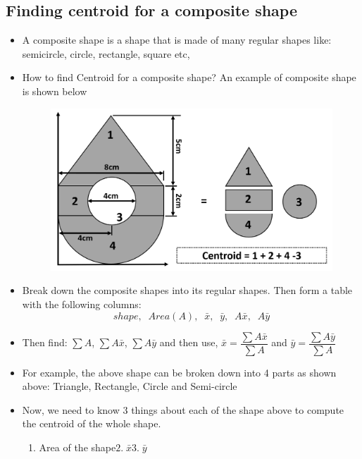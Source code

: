 \documentclass[8pt]{report}
\begin{document}
	\subsection{Finding centroid for a composite shape}
		\begin{itemize}
			\item A composite shape is a shape that is made of many regular shapes like: semicircle, circle, rectangle, square etc,
			\item How to find Centroid for a composite shape? An example of composite shape is shown below
			\begin{figure}[H]
				\centering
				\includegraphics[scale=0.4]{breakingcomposite.png}\\
			\end{figure}
			\item Break down the composite shapes into its regular shapes. Then form a table with the following columns: $$shape,\;\;Area(A),\;\;\bar{x},\;\;\bar{y},\;\;A\bar{x},\;\;A\bar{y}$$ 
			\item Then find: $\sum A$, $\sum A\bar{x}$, $\sum A\bar{y}$ and then use, $\bar{x} = \dfrac{\sum A\bar{x}}{\sum A}$ and $\bar{y} = \dfrac{\sum A\bar{y}}{\sum A}$
			\item For example, the above shape can be broken down into 4 parts as shown above: Triangle, Rectangle, Circle and Semi-circle
			\item Now, we need to know 3 things about each of the shape above to compute the centroid of the whole shape. 
				\begin{enumerate}
					\item Area of the shape\hspace{1cm}$2.\;\bar{x}$\hspace{1cm}$3.\;\bar{y}$				
				\end{enumerate}

\end{itemize}
\end{document}
